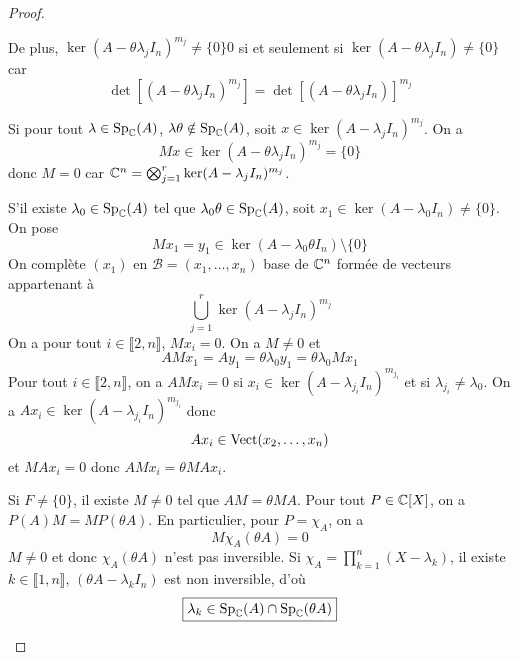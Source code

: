 \documentclass[12pt]{article}
\begin{document}
\begin{proof}
\begin{enumerate}
		De plus, $\ker(A-\theta\lambda_{j} I_{n})^{m_{j}}\neq\lbrace0\rbrace0$ si et seulement si $\ker(A-\theta\lambda_{j}I_{n})\neq\lbrace0\rbrace$ car \begin{equation}
			\det\left[(A-\theta\lambda_{j}I_{n})^{m_{j}}\right]=\det\left[(A-\theta\lambda_{j}I_{n})\right]^{m_{j}}
		\end{equation}

		Si pour tout $\lambda\in\operatorname{Sp}_{\mathbb{C}}(A)$, $\lambda\theta\notin\operatorname{Sp}_{\mathbb{C}}(A)$, soit $x\in\ker(A-\lambda_{j}I_{n})^{m_{j}}$. On a 
		\begin{equation}
			Mx\in\ker(A-\theta\lambda_{j}I_{n})^{m_{j}}=\lbrace0\rbrace
		\end{equation}
		donc $M=0$ car $\mathbb{C}^{n}=\bigotimes_{j=1}^{r}\ker(A-\lambda_{j}I_{n})^{m_{j}}$.

		S'il existe $\lambda_{0}\in\operatorname{Sp}_{\mathbb{C}}(A)$ tel que $\lambda_{0}\theta\in\operatorname{Sp}_{\mathbb{C}}(A)$, soit $x_{1}\in\ker(A-\lambda_{0}I_{n})\neq\lbrace0\rbrace$. On pose 
		\begin{equation}
			Mx_{1}=y_{1}\in\ker(A-\lambda_{0}\theta I_{n})\setminus\lbrace0\rbrace
		\end{equation}
		On complète $(x_{1})$ en $\mathcal{B}=(x_{1},\dots,x_{n})$ base de $\mathbb{C}^{n}$ formée de vecteurs appartenant à 
		\begin{equation}
			\bigcup_{j=1}^{r}\ker(A-\lambda_{j}I_{n})^{m_j}	
		\end{equation}
		On a pour tout $i\in\llbracket2,n\rrbracket$, $Mx_{i}=0$. On a $M\neq0$ et 
		\begin{equation}
			AMx_{1}=Ay_{1}=\theta\lambda_{0}y_{1}=\theta\lambda_{0}Mx_{1}
		\end{equation}
		Pour tout $i\in\llbracket2,n\rrbracket$, on a $AMx_{i}=0$ si $x_{i}\in\ker(A-\lambda_{j_{i}}I_{n})^{m_{j_{i}}}$ et si $\lambda_{j_{i}}\neq\lambda_{0}$. On a $Ax_{i}\in\ker(A-\lambda_{j_{i}}I_{n})^{m_{j_{i}}}$ donc 
		\begin{equation}
			Ax_{i}\in\operatorname{Vect}(x_{2},\dots,x_{n})
		\end{equation}
		et $MAx_{i}=0$ donc $AMx_{i}=\theta MAx_{i}$.

		Si $F\neq\lbrace0\rbrace$, il existe $M\neq0$ tel que $AM=\theta MA$. Pour tout $P\in\mathbb{C}[X]$, on a $P(A)M=MP(\theta A)$. En particulier, pour $P=\chi_{A}$, on a
		\begin{equation}
			M\chi_{A}(\theta A)=0
		\end{equation}
		$M\neq0$ et donc $\chi_{A}(\theta A)$ n'est pas inversible. Si $\chi_{A}=\prod_{k=1}^{n}(X-\lambda_{k})$, il existe $k\in\llbracket1,n\rrbracket$, $(\theta A-\lambda_{k}I_{n})$ est non inversible, d'où 
		\begin{equation}
			\boxed{\lambda_{k}\in\operatorname{Sp}_{\mathbb{C}}(A)\cap\operatorname{Sp}_{\mathbb{C}}(\theta A)}
		\end{equation}
	\end{enumerate}
\end{proof}
\end{document}
